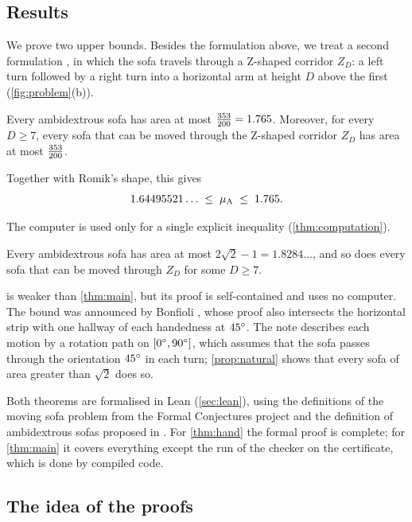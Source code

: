 \subsection{Results}

We prove two upper bounds. Besides the formulation above, we treat a second formulation \cite{optimisation-constants-repo}, in which the sofa travels through a Z-shaped corridor $Z_D$: a left turn followed by a right turn into a horizontal arm at height $D$ above the first (\cref{fig:problem}(b)).

\begin{thm}\label{thm:main}
Every ambidextrous sofa has area at most $\tfrac{353}{200}=1.765$. Moreover, for every $D\ge 7$, every sofa that can be moved through the Z-shaped corridor $Z_D$ has area at most $\tfrac{353}{200}$.
\end{thm}

Together with Romik's shape, this gives
\[
1.64495521\ldots \;\le\; \mu_{\mathrm{A}} \;\le\; 1.765 .
\]

The computer is used only for a single explicit inequality (\cref{thm:computation}).

\begin{thm}\label{thm:hand}
Every ambidextrous sofa has area at most $2\sqrt2-1=1.8284\ldots$, and so does every sofa that can be moved through $Z_D$ for some $D\ge 7$.
\end{thm}

 is weaker than \cref{thm:main}, but its proof is self-contained and uses no computer. The bound was announced by Bonfioli \cite{bonfioli2026}, whose proof also intersects the horizontal strip with one hallway of each handedness at $45^{\circ}$. The note describes each motion by a rotation path on $[0^{\circ},90^{\circ}]$, which assumes that the sofa passes through the orientation $45^{\circ}$ in each turn; \cref{prop:natural} shows that every sofa of area greater than $\sqrt2$ does so.

Both theorems are formalised in Lean (\cref{sec:lean}), using the definitions of the moving sofa problem from the Formal Conjectures project \cite{formalconjectures} and the definition of ambidextrous sofas proposed in \cite{fc_pr6424}. For \cref{thm:hand} the formal proof is complete; for \cref{thm:main} it covers everything except the run of the checker on the certificate, which is done by compiled code.

\subsection{The idea of the proofs}

